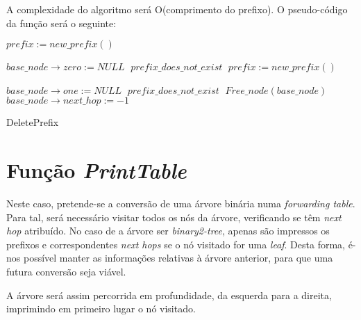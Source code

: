 \documentclass[twocolumn]{article}
\begin{document}
A complexidade do algoritmo será O(comprimento do prefixo). %
O pseudo-código da função será o seguinte:
\begin{algorithmic}
 	\;
 \EndIf
 		\State $prefix:=new\_prefix()\;$
 		
 				\State $base\_node \rightarrow zero:=NULL\;$
 			\EndIf
 		\Else
 			\State $prefix\_does\_not\_exist\;$
 			\;
 		\EndIf
 	\Else
 			\State $prefix:=new\_prefix()\;$
 		
 					\State $base\_node \rightarrow one:=NULL\;$
 				\EndIf
 			\Else
 				\State $prefix\_does\_not\_exist\;$
 				\;
 			\EndIf
 		\EndIf
 	\EndIf
 \Else
 		\State $Free\_node(base\_node)\;$
 		\;
 	\Else
		\State $base\_node \rightarrow next\_hop:=-1\;$	
 	\EndIf
 \EndIf
 \;
 \caption{DeletePrefix}
\end{algorithmic}
\section{Função \textit{PrintTable}}
Neste caso, pretende-se a conversão de uma árvore binária numa \textit{forwarding table}. Para tal, será necessário visitar todos os nós da árvore, verificando se têm \textit{next hop} atribuído. No caso de a árvore ser \textit{binary2-tree}, apenas são impressos os prefixos e correspondentes \textit{next hops} se o nó visitado for uma \textit{leaf}. Desta forma, é-nos possível manter as informações relativas à árvore anterior, para que uma futura conversão seja viável.

A árvore será assim percorrida em profundidade, da esquerda para a direita, imprimindo em primeiro lugar o nó visitado.
\end{document}

